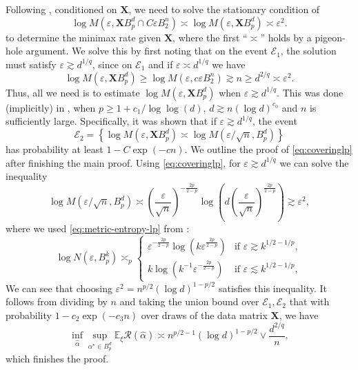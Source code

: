\documentclass[a4paper]{article}
\newcommand{\mathset}[1]{\left\{#1\right\}}
\newcommand{\pr}[1]{\left(#1\right)}
\newcommand{\X}[0]{\mathbf{X}}
\newcommand{\EE}[0]{\mathbb{E}}
\newcommand{\cE}[0]{\mathcal{E}}
\newcommand{\cR}[0]{\mathcal{R}}
\newcommand{\eps}[0]{\varepsilon}
\newcommand{\alphastar}{\alpha^\star}
\theoremstyle{thmstyle}
\theoremstyle{defstyle}
\theoremstyle{remark}
\begin{document}
    Following \cite{Neykov2022minimax}, conditioned on $\X$, we need to solve the stationary condition of 
    \begin{equation*}
        \log M(\eps,\mathbf{X}B_p^d  \cap C\eps B_2^n) \asymp \log M(\eps,\mathbf{X}B_p^d )  \asymp \eps^2.
    \end{equation*}
    to determine the minimax rate given $\X$, where the first ``$\asymp$'' holds by a pigeon-hole argument.
    We solve this by first noting that on the event $\cE_1$, the solution must satisfy $\eps \gtrsim d^{1/q}$, since on $\cE_1$ and if $\eps \asymp d^{1/q}$ we have
    \begin{equation*}
        \log M (\eps , \X B_p^d ) \geq \log M (\eps , c\eps B_2^n ) \gtrsim n \geq d^{2/q} \asymp \eps^2.
    \end{equation*}
    Thus, all we need is to estimate $ \log M(\eps,\mathbf{X}B_p^d ) $ when $\eps \gtrsim d^{1/q}$. This was done (implicitly) in \cite{Kur2024minimum}, when $p \geq 1+ c_1/\log\log(d)$, $ d \gtrsim n(\log d)^{c_0}$ and $n$ is sufficiently large. Specifically, it was shown that if $ \eps \gtrsim  d^{1/q}$, the event
    \begin{equation}\label{eq:coveringlp}
                 \cE_2 = \mathset{\log M(\eps,\mathbf{X}B_p^d  ) \asymp \log M(\eps/\sqrt{n}, B_p^d )}
    \end{equation}
    has probability at least $1-C\exp\pr{-cn}$. 
    We outline the proof of \eqref{eq:coveringlp} after finishing the main proof.
    Using \eqref{eq:coveringlp}, for $\eps \gtrsim d^{1/q}$ we can solve the inequality
    \begin{equation*}
        \log M(\eps /\sqrt{n}, B_p^d )  \asymp \pr{\frac{\eps}{\sqrt{n}}}^{-\frac{2p}{2-p}}\log \pr{d\pr{\frac{\eps}{\sqrt{n}}}^{\frac{2p}{2-p}}} \gtrsim \eps^2,
    \end{equation*}
    where we used \eqref{eq:metric-entropy-lp} from \cite{Schutt1984entropy}:
    \begin{equation}
    \label{eq:metric-entropy-lp}
        \log N(\eps,B_p^k)\asymp_p
        \begin{cases}
            \eps^{-\frac{2p}{2-p}}\log\pr{k \eps^{\frac{2p}{2-p}}} & \text{if } \eps \gtrsim k^{1/2-1/p}, \\
            k\log \pr{k^{-1}\eps^{-\frac{2p}{2-p}}} & \text{if } \eps \lesssim k^{1/2-1/p},
        \end{cases}
    \end{equation}
    We can see that choosing $\eps^2 = n^{p/2}(\log d)^{1-p/2}$ satisfies this inequality.
    It follows from dividing by $n$ and taking the union bound over $\cE_1,\cE_2$ that with probability $1-c_2\exp(-c_3n)$ over draws of the data matrix $\X$, we have
    \begin{equation*}
        \inf_{\widehat\alpha}\sup_{\alphastar \in B_p^d} \EE_\xi \cR(\widehat\alpha) \asymp n^{p/2-1} (\log d)^{1-p/2}  \vee \frac{d^{2/q}}{n},
    \end{equation*}
    which finishes the proof.
    
\end{document}
